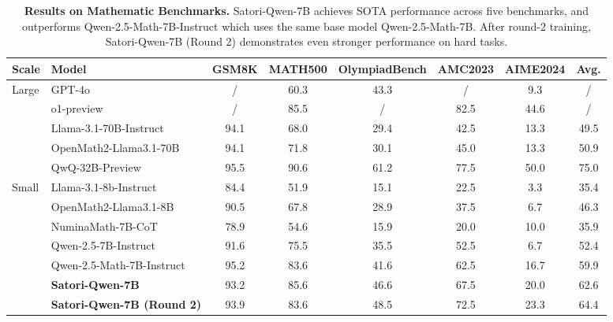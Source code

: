 \begin{table*}[!t]
\centering
\footnotesize
\captionsetup{font=small}
\caption{\textbf{Results on Mathematic Benchmarks.} Satori-Qwen-7B achieves SOTA performance across five benchmarks, and outperforms Qwen-2.5-Math-7B-Instruct which uses the same base model Qwen-2.5-Math-7B. After round-2 training, Satori-Qwen-7B (Round 2) demonstrates even stronger performance on hard tasks.}
\vspace{-0.5em}
\begin{tabular}{llcccccc}
\toprule[1.5pt]
\textbf{Scale}         & \textbf{Model}  & \textbf{GSM8K}   & \textbf{MATH500}  & \textbf{OlympiadBench} & \textbf{AMC2023} & \textbf{AIME2024} & \textbf{Avg.} \\ \midrule
\multirow{5}{*}{Large} & GPT-4o             & /       & 60.3                          & 43.3                   & /                & 9.3               & / \\
                       & o1-preview          & /      & 85.5                           & /                      & 82.5             & 44.6              & / \\
                       & Llama-3.1-70B-Instruct  & 94.1  & 68.0                        & 29.4                  & 42.5             & 13.3             & 49.5 \\
                       & OpenMath2-Llama3.1-70B   & 94.1 & 71.8                       & 30.1                  & 45.0               & 13.3             & 50.9 \\
                       & QwQ-32B-Preview       & 95.5    & 90.6                      & 61.2                   & 77.5             & 50.0               & 75.0 \\ \midrule
\multirow{7}{*}{Small} & Llama-3.1-8b-Instruct  & 84.4   & 51.9                      & 15.1                  & 22.5             & 3.3              & 35.4 \\
                      & OpenMath2-Llama3.1-8B   & 90.5  & 67.8                       & 28.9                  & 37.5             & 6.7              & 46.3 \\
                       & NuminaMath-7B-CoT      & 78.9   & 54.6                       & 15.9                  & 20.0               & 10.0                & 35.9 \\
                       & Qwen-2.5-7B-Instruct  & 91.6    & 75.5                      & 35.5                  & 52.5             & 6.7              & 52.4 \\
                       & Qwen-2.5-Math-7B-Instruct & 95.2 & 83.6                      & 41.6                  & 62.5             & 16.7             & 59.9 \\ \cmidrule{2-8} 
                       & \textbf{Satori-Qwen-7B}     & 93.2        & 85.6                 & 46.6                  & 67.5             & 20.0        & 62.6 \\
                       & \textbf{Satori-Qwen-7B (Round 2)}     & 93.9       & 83.6                   & 48.5                  & 72.5             & 23.3  & 64.4 \\ \bottomrule[1.5pt]
\end{tabular}

\label{table:main-results}
\end{table*}